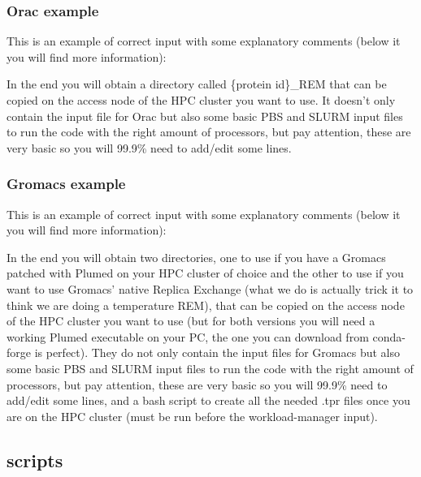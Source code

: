 				\subsubsection*{Orac example}
				
					This is an example of correct input with some explanatory comments (below it you will find more information):
					
					

					In the end you will obtain a directory called \{protein id\}\_REM that can be copied on the access node of the HPC cluster you want to use. It doesn't only contain the input file for Orac\cite{orac} but also some basic PBS and SLURM input files to run the code with the right amount of processors, but pay attention, these are very basic so you will 99.9\% need to add/edit some lines.
								
				\subsubsection*{Gromacs example}
				
					This is an example of correct input with some explanatory comments (below it you will find more information):
				
					
				
					In the end you will obtain two directories, one to use if you have a Gromacs\cite{gromacs_ABRAHAM201519} patched with Plumed\cite{plumed} on your HPC cluster of choice and the other to use if you want to use Gromacs' native Replica Exchange (what we do is actually trick it to think we are doing a temperature REM), that can be copied on the access node of the HPC cluster you want to use (but for both versions you will need a working Plumed executable on your PC, the one you can download from conda-forge is perfect). They do not only contain the input files for Gromacs but also some basic PBS and SLURM input files to run the code with the right amount of processors, but pay attention, these are very basic so you will 99.9\% need to add/edit some lines, and a bash script to create all the needed .tpr files once you are on the HPC cluster (must be run before the workload-manager input).
				
	\subsection{scripts}
	
